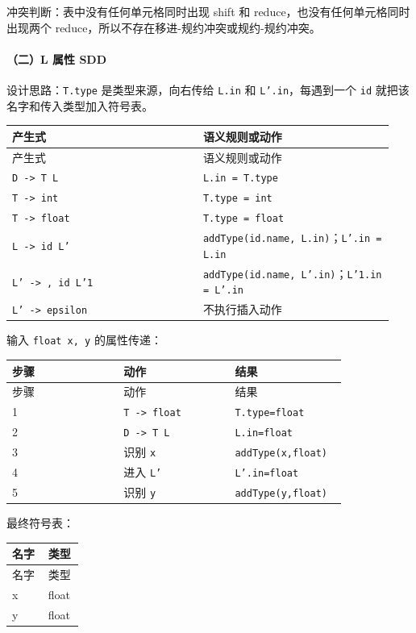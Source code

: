 \documentclass[UTF8]{ctexart}
\begin{document}
冲突判断：表中没有任何单元格同时出现 shift 和 reduce，也没有任何单元格同时出现两个 reduce，所以不存在移进-规约冲突或规约-规约冲突。

\paragraph*{（二）L 属性 SDD}

设计思路：\texttt{T.type} 是类型来源，向右传给 \texttt{L.in} 和 \texttt{L'.in}，每遇到一个 \texttt{id} 就把该名字和传入类型加入符号表。

\begin{longtable}{|p{0.47\linewidth}|p{0.47\linewidth}|}
\hline
产生式 & 语义规则或动作 \\
\hline
\endfirsthead
产生式 & 语义规则或动作 \\
\hline
\endhead
\texttt{D -> T L} & \texttt{L.in = T.type} \\
\hline
\texttt{T -> int} & \texttt{T.type = int} \\
\hline
\texttt{T -> float} & \texttt{T.type = float} \\
\hline
\texttt{L -> id L'} & \texttt{addType(id.name, L.in)}；\texttt{L'.in = L.in} \\
\hline
\texttt{L' -> , id L'1} & \texttt{addType(id.name, L'.in)}；\texttt{L'1.in = L'.in} \\
\hline
\texttt{L' -> epsilon} & 不执行插入动作 \\
\hline
\end{longtable}

输入 \texttt{float x, y} 的属性传递：

\begin{longtable}{|p{0.31\linewidth}|p{0.31\linewidth}|p{0.31\linewidth}|}
\hline
步骤 & 动作 & 结果 \\
\hline
\endfirsthead
步骤 & 动作 & 结果 \\
\hline
\endhead
1 & \texttt{T -> float} & \texttt{T.type=float} \\
\hline
2 & \texttt{D -> T L} & \texttt{L.in=float} \\
\hline
3 & 识别 \texttt{x} & \texttt{addType(x,float)} \\
\hline
4 & 进入 \texttt{L'} & \texttt{L'.in=float} \\
\hline
5 & 识别 \texttt{y} & \texttt{addType(y,float)} \\
\hline
\end{longtable}

最终符号表：

\begin{longtable}{|p{0.47\linewidth}|p{0.47\linewidth}|}
\hline
名字 & 类型 \\
\hline
\endfirsthead
名字 & 类型 \\
\hline
\endhead
x & float \\
\hline
y & float \\
\hline
\end{longtable}
\end{document}
